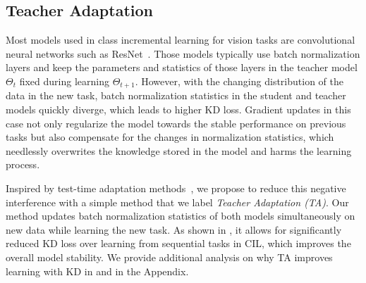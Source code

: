 \documentclass[10pt,twocolumn,letterpaper]{article}
\newcommand\rev[1]{{#1}}
\newcommand\gkd{GKD}
\newcommand\mkd{MKD}
\newcommand\tkd{TKD}
\begin{document}

\subsection{Teacher Adaptation} 

Most models used in class incremental learning for vision tasks are convolutional neural networks such as ResNet~\cite{he2016deep}. Those models typically use batch normalization layers and keep the parameters and statistics of those layers in the teacher model $\Theta_{t}$ fixed during learning $\Theta_{t+1}$. However, with the changing distribution of the data in the new task, batch normalization statistics in the student and teacher models quickly diverge, which leads to higher KD loss. Gradient updates in this case not only regularize the model towards the stable performance on previous tasks but also compensate for the changes in normalization statistics, which needlessly overwrites the knowledge stored in the model and harms the learning process.

Inspired by test-time adaptation methods~\cite{TENT}, we propose to reduce this negative interference with a simple method that we label \emph{Teacher Adaptation (TA)}. Our method updates batch normalization statistics of both models simultaneously on new data while learning the new task. As shown in , it allows for significantly reduced KD loss over learning from sequential tasks in CIL, which improves the overall model stability. \rev{We provide additional analysis on why TA improves learning with KD in \Cref{sec:exp:bn_ablations} and in the Appendix.}
\end{document}
